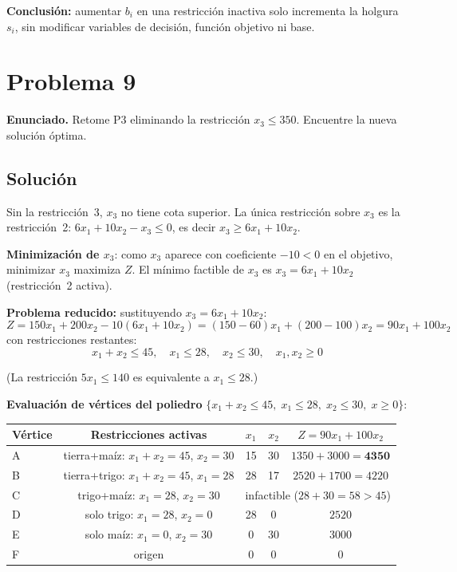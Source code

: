 \documentclass{article}
\begin{document}
\textbf{Conclusión:} aumentar $b_i$ en una restricción inactiva solo incrementa la holgura $s_i$, sin modificar variables de decisión, función objetivo ni base.

\newpage
\section*{Problema 9}

\textbf{Enunciado.} Retome P3 eliminando la restricción $x_3\leq350$. Encuentre la nueva solución óptima.

\subsection*{Solución}

Sin la restricción~3, $x_3$ no tiene cota superior. La única restricción sobre $x_3$ es la restricción~2: $6x_1+10x_2-x_3\leq0$, es decir $x_3\geq6x_1+10x_2$.

\textbf{Minimización de $x_3$}: como $x_3$ aparece con coeficiente $-10<0$ en el objetivo, minimizar $x_3$ maximiza $Z$. El mínimo factible de $x_3$ es $x_3=6x_1+10x_2$ (restricción~2 activa).

\textbf{Problema reducido:} sustituyendo $x_3=6x_1+10x_2$:
$$Z=150x_1+200x_2-10(6x_1+10x_2)=(150-60)x_1+(200-100)x_2=90x_1+100x_2$$
con restricciones restantes:
$$x_1+x_2\leq45,\quad x_1\leq28,\quad x_2\leq30,\quad x_1,x_2\geq0$$

(La restricción $5x_1\leq140$ es equivalente a $x_1\leq28$.)

\textbf{Evaluación de vértices del poliedro} $\{x_1+x_2\leq45,\;x_1\leq28,\;x_2\leq30,\;x\geq0\}$:

\begin{center}
\renewcommand{\arraystretch}{1.3}
\begin{tabular}{lcccc}
\hline
Vértice & Restricciones activas & $x_1$ & $x_2$ & $Z=90x_1+100x_2$ \\
\hline
A & tierra+maíz: $x_1+x_2=45$, $x_2=30$ & 15 & 30 & $1350+3000=\mathbf{4350}$ \\
B & tierra+trigo: $x_1+x_2=45$, $x_1=28$ & 28 & 17 & $2520+1700=4220$ \\
C & trigo+maíz: $x_1=28$, $x_2=30$ & \multicolumn{3}{c}{infactible ($28+30=58>45$)}\\
D & solo trigo: $x_1=28$, $x_2=0$ & 28 & 0 & $2520$ \\
E & solo maíz: $x_1=0$, $x_2=30$ & 0 & 30 & $3000$ \\
F & origen & 0 & 0 & $0$ \\
\hline
\end{tabular}
\end{center}
\end{document}
